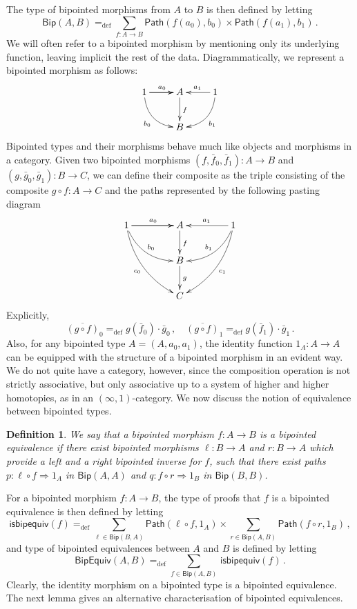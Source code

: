 \documentclass[10pt,a4paper,oneside,reqno]{amsart}
\numberwithin{equation}{section}
\theoremstyle{mythm}
\theoremstyle{mydef}
\newtheorem{definition}[theorem]{Definition}
\theoremstyle{myrmk}
\newcommand{\ie}{\text{i.e.\ }}
\newcommand{\myemph}[1]{\textit{#1}}
\newcommand{\defeq}{=_{\mathrm{def}}}
\newcommand{\co}{\colon}
\newcommand{\Id}{\mathsf{Path}}
\newcommand{\Bip}{\mathsf{Bip}}
\newcommand{\BipHom}{\mathsf{Bip}}
\newcommand{\isbipequiv}{\mathsf{isbipequiv}}
\newcommand{\BipEquiv}{\mathsf{BipEquiv}}
\begin{document}
The type of bipointed morphisms from $A$ to $B$ is then defined by letting
\[
\BipHom(A,B) \defeq \sum_{ f \co A \to B} \Id(  f(a_0), b_0 )  \times \Id(  f(a_1), b_1 ) \, .
\]
We will often refer to a bipointed morphism by mentioning only its underlying function, leaving implicit
the rest of the data. Diagrammatically, we represent a bipointed morphism as follows:
\[
\xymatrix{
1 \ar[r]   \ar[r]^{a_0} \ar@/_1pc/[dr]_{b_0}  & A  \ar[d]^{f} & 1  \ar[l]_{a_1} \ar@/^1pc/[dl]^{b_1} \\
  & B  &  }
 \]
Bipointed types and their morphisms behave much like objects and morphisms in a category.
Given two bipointed morphisms  $(f, \bar{f}_0, \bar{f}_1) \co A \to B$ and $(g, \bar{g}_0, \bar{g}_1) \co B \to C$, we can define their composite 
 as the triple consisting of the composite $g \circ f \co A \to C$ and the paths represented
by the following pasting diagram
\[
\xymatrix@C=1.5cm{
1 \ar[r]   \ar[r]^{a_0}   \ar@/_1pc/[dr]^{b_0} \ar@/_1pc/[ddr]_{c_0}  & A  \ar[d]^{f} & 1 \ar[l]_{a_1}  \ar@/^1pc/[dl]_{b_1}  \ar@/^1pc/[ddl]^{c_1} \\
  & B \ar[d]^g &   \\
  & C &   }
  \]
Explicitly,
\[
\overline{(g \circ f)}_0 \defeq g(\bar{f}_0) \cdot  \bar{g}_0 \, ,   \quad 
\overline{(g \circ f) }_1 \defeq  g(\bar{f}_1) \cdot   \bar{g}_1 \, .
\]
Also, for any bipointed type $A = (A, a_0, a_1)$, the identity function $1_A \co A \to A$ can be equipped with the structure of a 
bipointed morphism in an evident way. 
We do not quite have a category, however, since the composition operation is not strictly associative, but only associative up to a system of higher and higher 
homotopies, as in an $(\infty,1)$-category.  We now discuss the notion of equivalence between bipointed types.



\begin{definition} We say that a bipointed morphism $f \co A \to B$ is a \myemph{bipointed equivalence}
if there exist bipointed morphisms $\ell \co B \to A$ and $r \co B \to A$ which provide a left and a right bipointed inverse for $f$, \ie such that there exist paths $p \co \ell \circ f \Rightarrow 1_A$ in $\Bip(A,A)$ and $q \co f \circ r \Rightarrow 1_B$
in $\Bip(B,B)$.
\end{definition}

For a bipointed morphism $f \co A \to B$, the type of proofs that $f$ is a bipointed equivalence is
then defined by letting
\[
\isbipequiv(f) \defeq   \sum_{\ell \in \BipHom(B,A)} \Id( \ell \circ f, 1_A ) \times 
    \sum_{r \in \BipHom(A, B)} \Id (f \circ r , 1_B ) \, ,
\]
and type of bipointed equivalences between $A$ and $B$ is defined by letting
\[
\BipEquiv(A, B)
\defeq    
\sum_{f \in \BipHom(A,B)} \, \isbipequiv(f)  \, . 
\] 
Clearly, the identity morphism on a bipointed type is a bipointed equivalence. The next lemma
gives an alternative characterisation of bipointed equivalences.
\end{document}
